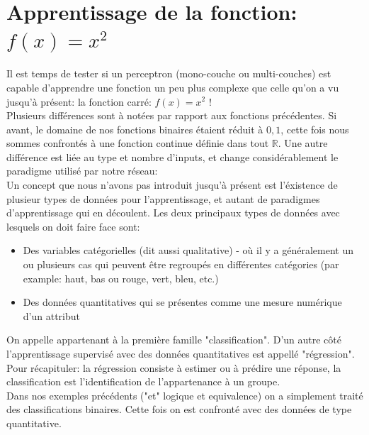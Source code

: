 \documentclass[twoside,openright,a4paper,11pt,french]{article}
\begin{document}
\section{Apprentissage de la fonction: $f(x) = x^2$}

Il est temps de tester si un perceptron (mono-couche ou multi-couches) est
capable d'apprendre une fonction un peu plus complexe que celle qu'on a vu jusqu'à présent: 
la fonction carré: $f(x) = x^2$ !\\

Plusieurs différences sont à notées par rapport aux fonctions précédentes.
Si avant, le domaine de nos fonctions binaires étaient réduit à ${0,1}$, cette
fois nous sommes confrontés à une fonction continue définie dans tout $\mathbb{R}$.
Une autre différence est liée au type et nombre d'inputs, et change
considérablement le paradigme utilisé par notre réseau:\\

Un concept que nous n'avons pas introduit jusqu'à présent est l'éxistence de plusieur
types de données pour l'apprentissage, et autant de paradigmes d'apprentissage qui en
découlent. Les deux principaux types de données avec lesquels on doit faire
face sont:

\begin{itemize}
\item Des variables catégorielles (dit aussi qualitative) - où il y a généralement
      un ou plusieurs cas qui peuvent être regroupés en différentes catégories 
     (par example: haut, bas ou rouge, vert, bleu, etc.)
\item Des données quantitatives qui se présentes comme une mesure numérique d'un attribut
\end{itemize}

On appelle %
appartenant à la première famille "classification". D'un autre côté l'apprentissage
supervisé avec des données quantitatives est appellé "régression".\cite{kindsNN}\\

Pour récapituler: la régression consiste à estimer ou à prédire une réponse,
la classification est l'identification de l'appartenance à un groupe.\\

Dans nos exemples précédents ("et" logique et equivalence) on a simplement
traité des classifications binaires. Cette fois on est confronté avec des données
de type quantitative.
\end{document}

